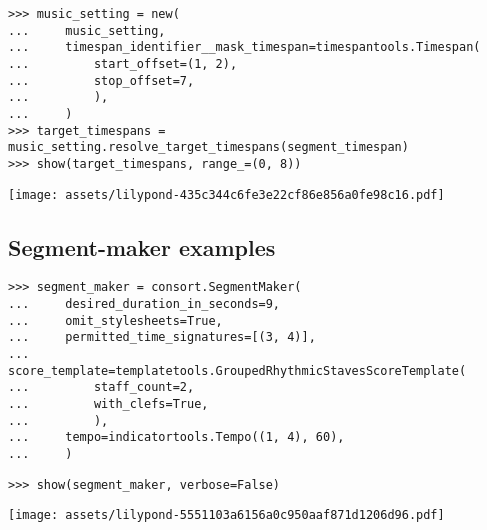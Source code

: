 \begin{singlespacing}
\vspace{-0.5\baselineskip}
\begin{lstlisting}
>>> music_setting = new(
...     music_setting,
...     timespan_identifier__mask_timespan=timespantools.Timespan(
...         start_offset=(1, 2),
...         stop_offset=7,
...         ),
...     )
>>> target_timespans = music_setting.resolve_target_timespans(segment_timespan)
>>> show(target_timespans, range_=(0, 8))
\end{lstlisting}
\noindent\texttt{[image: assets/lilypond-435c344c6fe3e22cf86e856a0fe98c16.pdf]}
\end{singlespacing}

\subsection{Segment-maker examples}

\begin{comment}
<abjad>
segment_maker = consort.SegmentMaker(
    desired_duration_in_seconds=9,
    omit_stylesheets=True,
    permitted_time_signatures=[(3, 4)],
    score_template=templatetools.GroupedRhythmicStavesScoreTemplate(
        staff_count=2,
        with_clefs=True,
        ),
    tempo=indicatortools.Tempo((1, 4), 60),
    )
</abjad>
\end{comment}

\begin{singlespacing}
\vspace{-0.5\baselineskip}
\begin{lstlisting}
>>> segment_maker = consort.SegmentMaker(
...     desired_duration_in_seconds=9,
...     omit_stylesheets=True,
...     permitted_time_signatures=[(3, 4)],
...     score_template=templatetools.GroupedRhythmicStavesScoreTemplate(
...         staff_count=2,
...         with_clefs=True,
...         ),
...     tempo=indicatortools.Tempo((1, 4), 60),
...     )
\end{lstlisting}
\end{singlespacing}

\begin{comment}
<abjad>[stylesheet=../consort.ily]
show(segment_maker, verbose=False)
</abjad>
\end{comment}

\begin{singlespacing}
\vspace{-0.5\baselineskip}
\begin{lstlisting}
>>> show(segment_maker, verbose=False)
\end{lstlisting}
\noindent\texttt{[image: assets/lilypond-5551103a6156a0c950aaf871d1206d96.pdf]}
\end{singlespacing}

